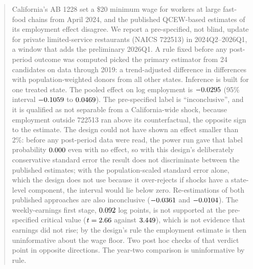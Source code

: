 \begin{abstract}
California's AB 1228 set a \$20 minimum wage for workers at large fast-food chains from April
2024, and the published QCEW-based estimates of its employment effect disagree. We report a
pre-specified, not blind, update for private limited-service restaurants (NAICS 722513) in
2024Q2--2026Q1, a window that adds the preliminary 2026Q1. A rule fixed before any post-period
outcome was computed picked the primary estimator from 24 candidates on data through 2019: a
trend-adjusted difference in differences with population-weighted donors from all other states.
Inference is built for one treated state. The pooled effect on log employment is $\HTwoAtt$
(95\% interval $\HTwoLoNinetyFive$ to $\HTwoHiNinetyFive$). The pre-specified label is
``inconclusive'', and it is qualified as not separable from a California-wide shock, because
employment outside 722513 ran above its counterfactual, the opposite sign to the estimate. The design could not have shown an
effect smaller than 2\%: before any post-period data were read, the power run gave that label
probability $\ProbTauZeroUndSmaller$ even with no effect, so with this design's deliberately
conservative standard error the result does not discriminate between the published estimates;
with the population-scaled standard error alone, which the design does not use because it
over-rejects if shocks have a state-level component, the interval would lie below zero. Re-estimations of both published approaches are also
inconclusive ($\SOneAtt$ and $\STwoAtt$). The weekly-earnings first stage, $\HOneAtt$ log
points, is not supported at the pre-specified critical value ($t = \HOneT$ against $\HOneCrit$),
which is not evidence that earnings did not rise; by the design's rule the employment estimate is
then uninformative about the wage floor. Two post hoc checks of that
verdict point in opposite directions. The year-two comparison is uninformative by rule.
\end{abstract}
